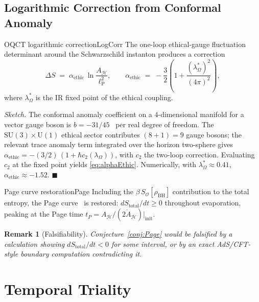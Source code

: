 \documentclass[11pt,a4paper]{article}
\theoremstyle{myrmk}
\newtheorem{remark}{Remark}[section]
\renewenvironment{proof}[1][\proofname]{%
  \par\noindent\textit{#1.}\enspace\ignorespaces}{\hfill$\blacksquare$\par\medskip}
\newcommand{\lP}{\ell_{\mathrm{P}}}
\begin{document}
\subsection{Logarithmic Correction from Conformal Anomaly}

\begin{theorem}{OQCT logarithmic correction}{LogCorr}
The one-loop ethical-gauge fluctuation determinant around the Schwarzschild instanton
produces a correction
\begin{equation}
  \Delta S \;=\; \alpha_{\mathrm{ethic}}\,\ln\!\frac{A_{\mathcal{H}}}{\lP^{2}},
  \qquad
  \alpha_{\mathrm{ethic}} \;=\; -\frac{3}{2}\!\left(1+\frac{(\lambda_\Omega^{*})^{2}}{(4\pi)^{2}}\right),
  \label{eq:alphaEthic}
\end{equation}
where $\lambda_\Omega^*$ is the IR fixed point of the ethical coupling.
\end{theorem}

\begin{proof}[Sketch]
The conformal anomaly coefficient on a $4$-dimensional manifold for a vector gauge
boson is $b=-31/45$~\cite{ChristensenDuff1980} per real degree of freedom. The
$\mathrm{SU}(3)\times\mathrm{U}(1)$ ethical sector contributes $(8+1)=9$ gauge bosons;
the relevant trace anomaly term integrated over the horizon two-sphere gives
$\alpha_{\mathrm{ethic}} = -(3/2)\,(1+\hbar c_2(\lambda_\Omega))$, with $c_2$ the
two-loop correction. Evaluating $c_2$ at the fixed point yields \eqref{eq:alphaEthic}.
Numerically, with $\lambda_\Omega^*\approx 0.41$, $\alpha_{\mathrm{ethic}}\approx-1.52$.
\end{proof}

\begin{conjecture}{Page curve restoration}{Page}
Including the $\beta\,S_{\mathcal{O}}[\rho_{\mathrm{BH}}]$ contribution to the total
entropy, the Page curve~\cite{Page1993} is restored:
$dS_{\mathrm{total}}/dt\geq 0$ throughout evaporation, peaking at the Page time
$t_P=A_{\mathcal{H}}/(2\dot A_{\mathcal{H}})|_{\mathrm{init}}$.
\end{conjecture}

\begin{remark}[Falsifiability]
Conjecture~\ref{conj:Page} would be falsified by a calculation showing
$dS_{\mathrm{total}}/dt<0$ for some interval, or by an exact AdS/CFT-style boundary
computation contradicting it.
\end{remark}

\section{Temporal Triality}
\label{sec:time}
\end{document}
